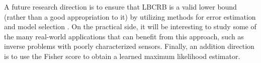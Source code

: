 \documentclass[journal,twoside,web]{ieeecolor}
\begin{document}
A future research direction is to ensure that LBCRB is
a valid lower bound (rather than a good appropriation to
it) by utilizing methods for error estimation and model
selection \cite{shalev2014understanding}. On the practical side, it will be interesting
to study some of the many real-world applications that
can benefit from this approach, such as inverse problems with poorly characterized sensors. Finally, an addition direction is to use the Fisher score to obtain a learned maximum likelihood estimator. 







\clearpage
\appendix




% 
\end{document}

